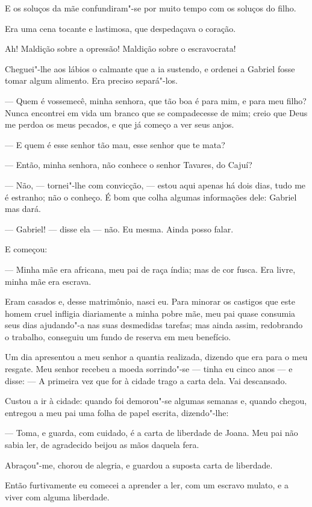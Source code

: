 E os soluços da mãe confundiram"-se por muito tempo com os soluços do
filho.

Era uma cena tocante e lastimosa, que despedaçava o coração.

Ah! Maldição sobre a opressão! Maldição sobre o escravocrata!

Cheguei"-lhe aos lábios o calmante que a ia sustendo, e ordenei a Gabriel
fosse tomar algum alimento. Era preciso separá"-los.

--- Quem é vossemecê, minha senhora, que tão boa é para mim, e para meu
filho? Nunca encontrei em vida um branco que se compadecesse de mim;
creio que Deus me perdoa os meus pecados, e que já começo a ver seus
anjos.

--- E quem é esse senhor tão mau, esse senhor que te mata?

--- Então, minha senhora, não conhece o senhor Tavares, do Cajuí?

--- Não, --- tornei"-lhe com convicção, --- estou aqui apenas há dois dias,
tudo me é estranho; não o conheço. É bom que colha algumas informações
dele: Gabriel mas dará.

--- Gabriel! --- disse ela --- não. Eu mesma. Ainda posso falar.

E começou:

--- Minha mãe era africana, meu pai de raça índia; mas de cor fusca. Era
livre, minha mãe era escrava.

Eram casados e, desse matrimônio, nasci eu. Para minorar os castigos que
este homem cruel infligia diariamente a minha pobre mãe, meu pai quase
consumia seus dias ajudando"-a nas suas desmedidas tarefas; mas ainda
assim, redobrando o trabalho, conseguiu um fundo de reserva em meu
benefício.

Um dia apresentou a meu senhor a quantia realizada, dizendo que era para
o meu resgate. Meu senhor recebeu a moeda sorrindo"-se --- tinha eu cinco
anos --- e disse: --- A primeira vez que for à cidade trago a carta dela.
Vai descansado.

Custou a ir à cidade: quando foi demorou"-se algumas semanas e, quando
chegou, entregou a meu pai uma folha de papel escrita, dizendo"-lhe:

--- Toma, e guarda, com cuidado, é a carta de liberdade de Joana. Meu
pai não sabia ler, de agradecido beijou as mãos daquela fera.

Abraçou"-me, chorou de alegria, e guardou a suposta carta de liberdade.

Então furtivamente eu comecei a aprender a ler, com um escravo mulato, e
a viver com alguma liberdade.

